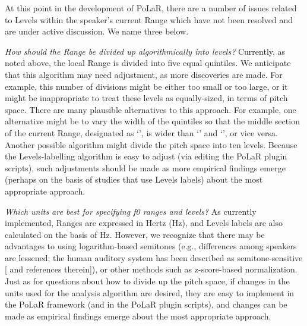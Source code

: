 \documentclass[11pt, twoside]{memoir}
\def\textlabel#1{{\relsize{-.5}\fontspec[Mapping=tex-text]{Roboto Mono}{#1}}}
\begin{document}
At this point in the development of PoLaR, there are a number of issues related to Levels within the speaker’s current Range which have not been resolved and are under active discussion.  We name three below.

\textit{How should the Range be divided up algorithmically into levels?} Currently, as noted above, the local Range is divided into five equal quintiles. We anticipate that this algorithm may need adjustment, as more discoveries are made. For example, this number of divisions might be either too small or too large, or it might be inappropriate to treat these levels as equally-sized, in terms of pitch space. There are many plausible alternatives to this approach. For example, one alternative might be to vary the width of the quintiles so that the middle section of the current Range, designated as ‘\textlabel{3}’, is wider than ‘\textlabel{1}’ and ‘\textlabel{5}’, or vice versa. Another possible algorithm might divide the pitch space into ten levels. Because the Levels-labelling algorithm is easy to adjust (via editing the PoLaR plugin scripts), such adjustments should be made as more empirical findings emerge (perhaps on the basis of studies that use Levels labels) about the most appropriate approach.

\textit{Which units are best for specifying f0 ranges and levels?} As currently implemented, Ranges are expressed in Hertz (Hz), and Levels labels are also calculated on the basis of Hz. However, we recognize that there may be advantages to using logarithm-based semitones (e.g., differences among speakers are lessened; the human auditory system has been described as semitone-sensitive [\citealt{nolan03} and references therein]), or other methods such as z-score-based normalization. Just as for questions about how to divide up the pitch space, if changes in the units used for the analysis algorithm are desired, they are easy to implement in the PoLaR framework (and in the PoLaR plugin scripts), and changes can be made as empirical findings emerge about the most appropriate approach.
\end{document}
